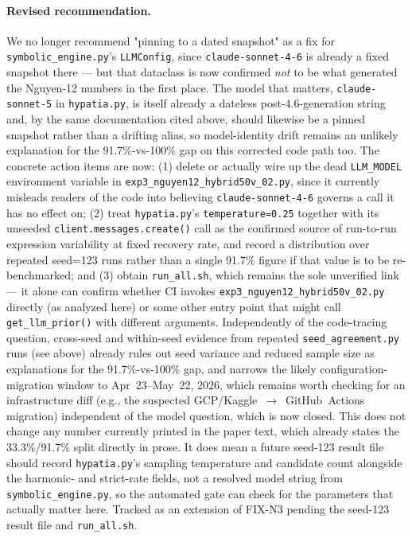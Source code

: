 \paragraph{Revised recommendation.} We no longer recommend "pinning to a
dated snapshot" as a fix for \texttt{symbolic\_engine.py}'s
\texttt{LLMConfig}, since \texttt{claude-sonnet-4-6} is already a fixed
snapshot there — but that dataclass is now confirmed \emph{not} to be
what generated the Nguyen-12 numbers in the first place. The model that
matters, \texttt{claude-sonnet-5} in \texttt{hypatia.py}, is itself
already a dateless post-4.6-generation string and, by the same
documentation cited above, should likewise be a pinned snapshot rather
than a drifting alias, so model-identity drift remains an unlikely
explanation for the 91.7\%-vs-100\% gap on this corrected code path too.
The concrete action items are now: (1) delete or actually wire up the
dead \texttt{LLM\_MODEL} environment variable in
\texttt{exp3\_nguyen12\_hybrid50v\_02.py}, since it currently misleads
readers of the code into believing \texttt{claude-sonnet-4-6} governs a
call it has no effect on; (2) treat \texttt{hypatia.py}'s
\texttt{temperature=0.25} together with its unseeded
\texttt{client.messages.create()} call as the confirmed source of
run-to-run expression variability at fixed recovery rate, and record a
distribution over repeated seed=123 runs rather than a single 91.7\%
figure if that value is to be re-benchmarked; and (3) obtain
\texttt{run\_all.sh}, which remains the sole unverified link — it alone
can confirm whether CI invokes
\texttt{exp3\_nguyen12\_hybrid50v\_02.py} directly (as analyzed here) or
some other entry point that might call \texttt{get\_llm\_prior()} with
different arguments. Independently of the code-tracing question,
cross-seed and within-seed evidence from repeated
\texttt{seed\_agreement.py} runs (see above) already rules out seed
variance and reduced sample size as explanations for the
91.7\%-vs-100\% gap, and narrows the likely configuration-migration
window to Apr~23–May~22, 2026, which remains worth checking for an
infrastructure diff (e.g., the suspected
GCP/Kaggle~$\to$~GitHub~Actions migration) independent of the model
question, which is now closed. This does not change any number
currently printed in the paper text, which already states the
33.3\%/91.7\% split directly in prose. It does mean a future seed-123
result file should record \texttt{hypatia.py}'s sampling temperature and
candidate count alongside the harmonic- and strict-rate fields, not a
resolved model string from \texttt{symbolic\_engine.py}, so the
automated gate can check for the parameters that actually matter here.
Tracked as an extension of FIX-N3 pending the seed-123 result file and
\texttt{run\_all.sh}.
